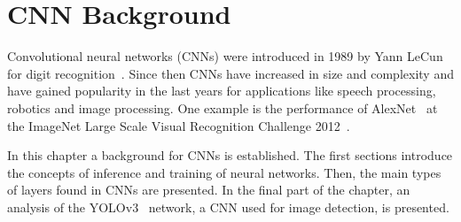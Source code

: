 \chapter{CNN Background}
\label{chapter:background}

%
%

Convolutional neural networks (CNNs) were introduced in 1989 by Yann LeCun for
digit recognition~\cite{lecun:handwritten_zipcodes89}. Since then CNNs have
increased in size and complexity and have gained popularity in the last years
for applications like speech processing, robotics and image processing. One
example is the performance of AlexNet~\cite{AlexNetKrizhevsky:2012} at the
ImageNet Large Scale Visual Recognition Challenge
2012~\cite{ImageNet2012_ILSVRC15}.

In this chapter a background for CNNs is established. The first sections
introduce the concepts of inference and training of neural networks. Then, the
main types of layers found in CNNs are presented. In the final part of the
chapter, an analysis of the YOLOv3~\cite{yolov3} network, a CNN used for image
detection, is presented.


